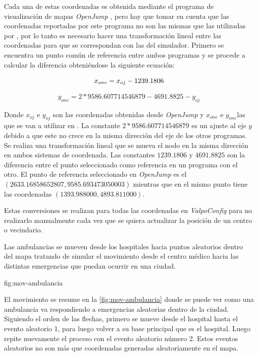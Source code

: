 Cada una de estas coordenadas es obtenida mediante el programa de visualización
de mapas \textit{OpenJump} \cite{open_jump}, pero hay que tomar en cuenta que
las coordenadas reportadas por este programa no son las mismas que las
utilizadas por \theone, por lo tanto es necesario hacer una transformación
lineal entre las coordenadas para que se correspondan con las del simulador.
Primero se encuentra un punto común de referencia entre ambos programas y se
procede a calcular la diferencia obteniéndose la siguiente ecuación:


\begin{equation}
  x_{one} = x_{oj} - 1239.1806\\
\end{equation}

\begin{equation}
  y_{one} = 2*9586.607714546879 - 4691.8825 - y_{oj}
\end{equation}


Donde $x_{oj}$ e $y_{oj}$ son las coordenadas obtenidas desde \textit{OpenJump}
y $x_{one}$ e $y_{one}$las que se van a utilizar en \theone. La constante
$2*9586.607714546879$ es un ajuste al eje $y$ debido a que este no crece en la
misma dirección del eje de los otros programas. Se realiza una transformación
lineal que se mueva el nodo en la misma dirección en ambos sistemas de coordenada.
Las constantes $1239.1806$ y $4691.8825$ son la diferencia entre el punto
seleccionado como referencia en un programa con el otro. El punto de referencia
seleccionado en \textit{OpenJump} es el $(2633.16858652807, 9585.693473050003)$
mientras que en \theone{} el mismo punto tiene las coordenadas
$(1393.988000,4893.811000)$.

Estas conversiones se realizan para todas las coordenadas en
\textit{ValpoConfig} para no realizarlo manualmente cada vez que se quiera
actualizar la posición de un centro o vecindario.




Las ambulancias se mueven desde los hospitales hacia puntos aleatorios dentro
del mapa tratando de simular el movimiento desde el centro médico hacia
las distintas emergencias que puedan ocurrir en una ciudad.


{}{fig:mov-ambulancia}


El movimiento se resume en la \ref{fig:mov-ambulancia} donde se puede ver como
una ambulancia va respondiendo a emergencias aleatorias dentro de la ciudad.
Siguiendo el orden de las flechas, primero se mueve desde el hospital hasta el
evento aleatorio 1, para luego volver a su base principal que es el hospital.
Luego repite nuevamente el proceso con el evento aleatorio número 2. Estos
eventos aleatorios no son más que coordenadas generadas aleatoriamente en el
mapa. 

